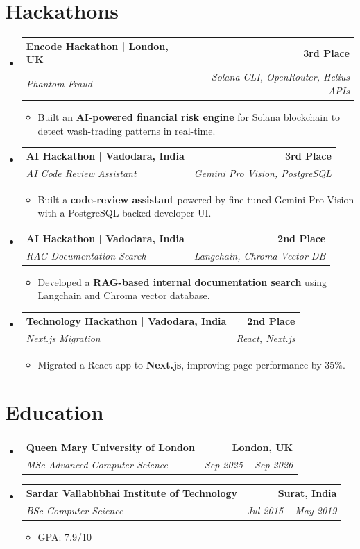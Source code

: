 \documentclass[letterpaper,11pt]{article}
\makeatletter
\newcommand{\resumeItem}[1]{
  \item\small{
    {#1 \vspace{-3pt}}
  }
}
\newcommand{\resumeSubheading}[4]{
  \vspace{-3pt}\item
    \begin{tabular*}{1.0\textwidth}[t]{l@{\extracolsep{\fill}}r}
      \textbf{#1} & \textbf{\small #2} \\
      \textit{\small#3} & \textit{\small #4} \\
    \end{tabular*}\vspace{-7pt}
}
\newcommand{\resumeSubHeadingListStart}{\begin{itemize}[leftmargin=0.0in, label={}]}
\newcommand{\resumeSubHeadingListEnd}{\end{itemize}}
\newcommand{\resumeItemListStart}{\begin{itemize}}
\newcommand{\resumeItemListEnd}{\end{itemize}\vspace{0pt}}
\makeatother
\begin{document}
\section{Hackathons}
\resumeSubHeadingListStart
    \resumeSubheading
      {Encode Hackathon | London, UK}{3rd Place}
      {Phantom Fraud}{Solana CLI, OpenRouter, Helius APIs}
      \resumeItemListStart
        \resumeItem{Built an \textbf{AI-powered financial risk engine} for Solana blockchain to detect wash-trading patterns in real-time.}
      \resumeItemListEnd
    \resumeSubheading
      {AI Hackathon | Vadodara, India}{3rd Place}
      {AI Code Review Assistant}{Gemini Pro Vision, PostgreSQL}
      \resumeItemListStart
        \resumeItem{Built a \textbf{code-review assistant} powered by fine-tuned Gemini Pro Vision with a PostgreSQL-backed developer UI.}
      \resumeItemListEnd
    \resumeSubheading
      {AI Hackathon | Vadodara, India}{2nd Place}
      {RAG Documentation Search}{Langchain, Chroma Vector DB}
      \resumeItemListStart
        \resumeItem{Developed a \textbf{RAG-based internal documentation search} using Langchain and Chroma vector database.}
      \resumeItemListEnd
    \resumeSubheading
      {Technology Hackathon | Vadodara, India}{2nd Place}
      {Next.js Migration}{React, Next.js}
      \resumeItemListStart
        \resumeItem{Migrated a React app to \textbf{Next.js}, improving page performance by 35\%.}
      \resumeItemListEnd
\resumeSubHeadingListEnd

\section{Education}
  \resumeSubHeadingListStart
    \resumeSubheading
      {Queen Mary University of London}{London, UK}
      {MSc Advanced Computer Science}{Sep 2025 -- Sep 2026}
    \resumeSubheading
      {Sardar Vallabhbhai Institute of Technology}{Surat, India}
      {BSc Computer Science}{Jul 2015 -- May 2019}
      \resumeItemListStart
        \resumeItem{GPA: 7.9/10}
      \resumeItemListEnd
  \resumeSubHeadingListEnd

\end{document}
